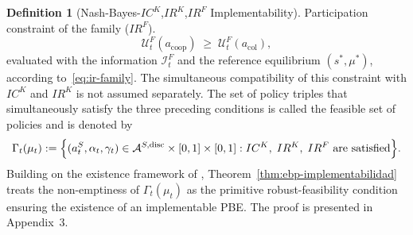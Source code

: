\documentclass[ecta,nameyear,draft]{econsocart}
\theoremstyle{plain}
\theoremstyle{definition}
\newtheorem{definition}[theorem]{Definition}
\newcommand{\1}{\mathbf{1}}
\begin{document}
\begin{definition}[Nash-Bayes-$IC^K$,$IR^K$,$IR^F$ Implementability]
\smallskip
\noindent Participation constraint of the family \textup{(}$IR^F$\textup{)}.
\[
\mathcal{U}^F_t(a_{\mathrm{coop}})\;\ge\;\mathcal{U}^F_t(a_{\mathrm{col}}),
\]
evaluated with the information $\mathcal{I}_t^F$ and the reference equilibrium $(s^\ast,\mu^\ast)$, according to~\eqref{eq:ir-family}.
The simultaneous compatibility of this constraint with $IC^K$ and $IR^K$ is not assumed separately. The set of policy triples that simultaneously satisfy the three preceding conditions is called the feasible set of policies and is denoted by
\begin{equation}
\label{eq:gamma-factible}
\Gamma_t(\mu_t)
:=\Bigl\{(a_t^S,\alpha_t,\gamma_t)\in
\mathcal{A}^{S,\mathrm{disc}}\times[0,1]\times[0,1] :
IC^K,\;IR^K,\;IR^F
\text{ are satisfied}\Bigr\}.
\end{equation}
Building on the existence framework of \citet{KadanRenySwinkels2017}, Theorem~\ref{thm:ebp-implementabilidad} treats the non-emptiness of $\Gamma_t(\mu_t)$ as the primitive robust-feasibility condition ensuring the existence of an implementable PBE. The proof is presented in Appendix~3.
\end{definition}
\end{document}
